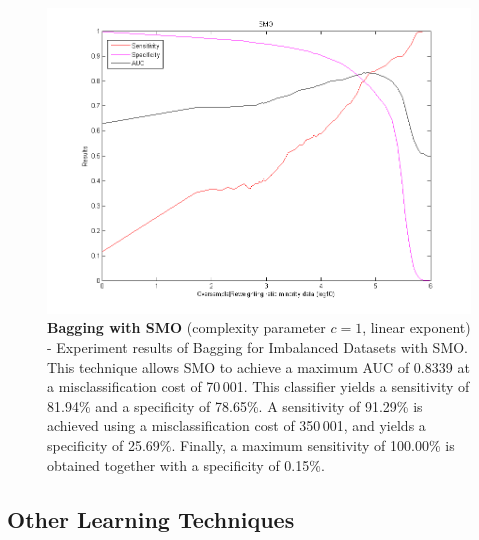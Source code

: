\newpage
\begin{figure}[h]
\includegraphics[scale=0.65]{img/bi_SMO.png}
\caption{\textbf{Bagging with SMO} (complexity parameter $c = 1$, linear exponent) - Experiment results of Bagging for Imbalanced Datasets with SMO. This technique allows SMO to achieve a maximum AUC of 0.8339 at a misclassification cost of 70\,001. This classifier yields a sensitivity of 81.94\% and a specificity of 78.65\%. A sensitivity of 91.29\% is achieved using a misclassification cost of 350\,001, and yields a specificity of 25.69\%. Finally, a maximum sensitivity of 100.00\% is obtained together with a specificity of 0.15\%.}
\end{figure}

\newpage
\subsection{Other Learning Techniques}\label{exp-other}

